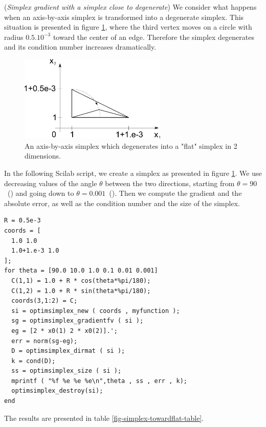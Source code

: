 \begin{example}
(\emph{Simplex gradient with a simplex close to degenerate})
We consider what happens when an axis-by-axis simplex is transformed into
a degenerate simplex. This situation is presented in figure \ref{fig-simplex-towardflat},
where the third vertex moves on a circle with radius $0.5.10^{-3}$
toward the center of an edge. Therefore the simplex degenerates
and its condition number increases dramatically.

\begin{figure}
\begin{center}
\includegraphics[width=7cm]{simplex_towardflat.pdf}
\end{center}
\caption{An axis-by-axis simplex which degenerates into a "flat" simplex in 2 dimensions.}
\label{fig-simplex-towardflat}
\end{figure}

In the following Scilab script, we create a simplex 
as presented in figure \ref{fig-simplex-towardflat}.
We use decreasing values of the angle $\theta$ between the 
two directions, starting from $\theta=90$~(\degre) and going 
down to $\theta=0.001$~(\degre).
Then we compute the gradient and the absolute error,
as well as the condition number and the size of the simplex.

\lstset{language=scilabscript}
\begin{lstlisting}
R = 0.5e-3
coords = [
  1.0 1.0
  1.0+1.e-3 1.0
];
for theta = [90.0 10.0 1.0 0.1 0.01 0.001]
  C(1,1) = 1.0 + R * cos(theta*%pi/180);
  C(1,2) = 1.0 + R * sin(theta*%pi/180);
  coords(3,1:2) = C;
  si = optimsimplex_new ( coords , myfunction );
  sg = optimsimplex_gradientfv ( si );
  eg = [2 * x0(1) 2 * x0(2)].';
  err = norm(sg-eg);
  D = optimsimplex_dirmat ( si );
  k = cond(D);
  ss = optimsimplex_size ( si );
  mprintf ( "%f %e %e %e\n",theta , ss , err , k);
  optimsimplex_destroy(si);
end
\end{lstlisting}

The results are presented in table \ref{fig-simplex-towardflat-table}.


\end{example}
